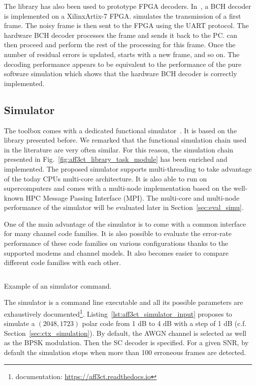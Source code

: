 The \AFFECT library has also been used to prototype FPGA decoders.
In~\cite{Cassagne2017a}, a BCH decoder is implemented on a Xilinx\R Artix-7
FPGA. \AFFECT simulates the transmission of a first frame. The noisy frame is
then sent to the FPGA using the UART protocol. The hardware BCH decoder
processes the frame and sends it back to the PC. \AFFECT can then proceed and
perform the rest of the processing for this frame. Once the number of residual
errors is updated, \AFFECT starts with a new frame, and so on. The decoding
performance appears to be equivalent to the performance of the pure software
simulation which shows that the hardware BCH decoder is correctly implemented.

\subsection{Simulator}

The \AFFECT toolbox comes with a dedicated functional
simulator~\cite{Cassagne2017}. It is based on the \AFFECT library presented
before. We remarked that the functional simulation chain used in the literature
are very often similar. For this reason, the simulation chain presented in
Fig.~\ref{fig:aff3ct_library_task_module} has been enriched and implemented. The
proposed simulator supports multi-threading to take advantage of the today CPUs
multi-core architecture. It is also able to run on supercomputers and comes with
a multi-node implementation based on the well-known HPC Message Passing
Interface (MPI). The multi-core and multi-node performance of the \AFFECT
simulator will be evaluated later in Section~\ref{sec:eval_simu}.

One of the main advantage of the \AFFECT simulator is to come with a common
interface for many channel code families. It is also possible to evaluate the
error-rate performance of these code families on various configurations thanks
to the supported modems and channel models. It also becomes easier to compare
different code families with each other.

\begin{listing}[htp]
  \inputminted[frame=lines]{bash}{main/chapter4/src/use_cases/simulator/input.txt}
  \caption{Example of an \AFFECT simulator command.}
  \label{lst:aff3ct_simulator_input}
\end{listing}

The \AFFECT simulator is a command line executable and all its possible
parameters are exhaustively documented\footnote{\AFFECT documentation:
\url{https://aff3ct.readthedocs.io}}. Listing~\ref{lst:aff3ct_simulator_input}
proposes to simulate a $(2048,1723)$ polar code from 1 dB to 4 dB with a step of
1 dB (c.f. Section~\ref{sec:ctx_simulation}). By default, the AWGN channel is
selected as well as the BPSK modulation. Then the SC decoder is specified. For a
given SNR, by default the simulation stops when more than 100 erroneous frames
are detected.


